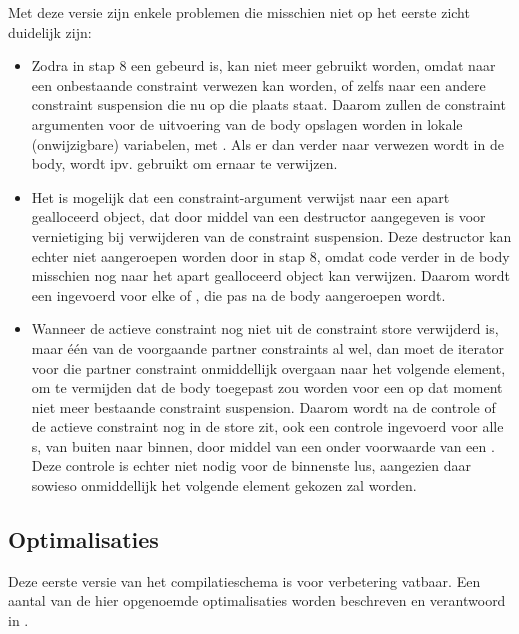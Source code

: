 Met deze versie zijn enkele problemen die misschien niet op het eerste zicht duidelijk zijn: \begin{itemize}
  \item Zodra in stap 8 een  gebeurd is, kan  niet meer gebruikt worden, omdat naar een onbestaande constraint verwezen kan worden, of zelfs naar een andere constraint suspension die nu op die plaats staat. Daarom zullen de constraint argumenten voor de uitvoering van de body opslagen worden in lokale (onwijzigbare) variabelen, met . Als er dan verder naar verwezen wordt in de body, wordt  ipv.  gebruikt om ernaar te verwijzen.
  \item Het is mogelijk dat een constraint-argument verwijst naar een apart gealloceerd object, dat door middel van een destructor aangegeven is voor vernietiging bij verwijderen van de constraint suspension. Deze destructor kan echter niet aangeroepen worden door  in stap 8, omdat code verder in de body misschien nog naar het apart gealloceerd object kan verwijzen. Daarom wordt een  ingevoerd voor elke  of , die pas na de body aangeroepen wordt.
  \item Wanneer de actieve constraint nog niet uit de constraint store verwijderd is, maar \'e\'en van de voorgaande partner constraints al wel, dan moet de iterator voor die partner constraint onmiddellijk overgaan naar het volgende element, om te vermijden dat de body toegepast zou worden voor een op dat moment niet meer bestaande constraint suspension. Daarom wordt na de controle of de actieve constraint nog in de store zit, ook een controle ingevoerd voor alle s, van buiten naar binnen, door middel van een  onder voorwaarde van een . Deze controle is echter niet nodig voor de binnenste lus, aangezien daar sowieso onmiddellijk het volgende element gekozen zal worden.
\end{itemize}

\subsection{Optimalisaties} \label{sec:optim}

Deze eerste versie van het compilatieschema is voor verbetering vatbaar. Een aantal van de hier opgenoemde optimalisaties worden beschreven en verantwoord in \cite{tomsphdthesis}. 

